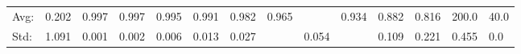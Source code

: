 \documentclass[11pt,onside]{article}
\begin{document}
\begin{description}
\begin {table}[ht]
\begin{tabular}{lcccc}
\bottomrule
Avg: & 0.202 & 0.997& 0.997& 0.995 & 0.991 & 0.982 & 0.965& & 0.934& 0.882 &0.816 & 200.0 & 40.0 \\
Std:&  1.091& 0.001& 0.002& 0.006&  0.013& 0.027& & 0.054& &0.109 & 0.221& 0.455& 0.0 \\
\bottomrule
\end{tabular}
\end{table}

\end{description}
\end{document}
